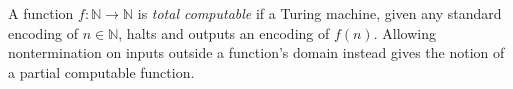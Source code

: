 
A function $f:\mathbb N\to\mathbb N$ is \emph{total computable} if a Turing machine, given any standard encoding of $n\in\mathbb N$, halts and outputs an encoding of $f(n)$. Allowing nontermination on inputs outside a function's domain instead gives the notion of a partial computable function.
